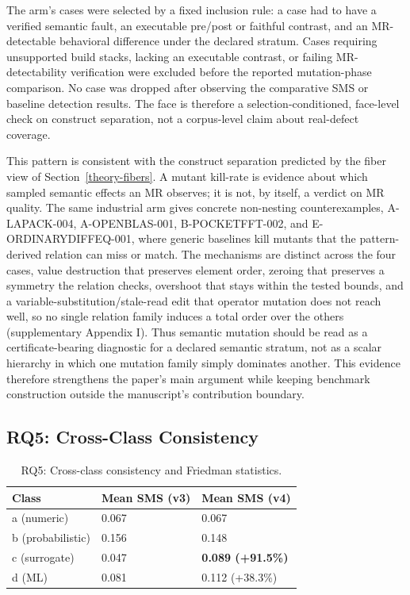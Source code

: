 \documentclass[manuscript,screen,review]{acmart}
\begin{document}
The arm's cases were selected by a fixed inclusion rule: a case had to have a
verified semantic fault, an executable pre/post or faithful contrast, and
an MR-detectable behavioral difference under the declared stratum.
Cases requiring unsupported build stacks, lacking an executable contrast,
or failing MR-detectability verification were excluded before the
reported mutation-phase comparison. No case was dropped after observing
the comparative SMS or baseline detection results. The face is therefore a selection-conditioned, face-level check on
construct separation, not a corpus-level claim about real-defect
coverage.

This pattern is consistent with the construct separation predicted by the
fiber view of Section~\ref{theory-fibers}. A mutant kill-rate is evidence about which sampled
semantic effects an MR observes; it is not, by itself, a verdict on MR
quality. The same industrial arm gives concrete non-nesting
counterexamples, A-LAPACK-004, A-OPENBLAS-001, B-POCKETFFT-002, and
E-ORDINARYDIFFEQ-001, where generic baselines kill mutants that the
pattern-derived relation can miss or match. The mechanisms are
distinct across the four cases, value destruction that preserves
element order, zeroing that preserves a symmetry the relation checks,
overshoot that stays within the tested bounds, and a
variable-substitution/stale-read edit that operator mutation does not
reach well, so no single relation family induces a total order over
the others (supplementary Appendix I).
Thus semantic mutation should be read as a certificate-bearing diagnostic
for a declared semantic stratum, not as a scalar hierarchy in which one
mutation family simply dominates another. This evidence therefore
strengthens the paper's main argument while keeping benchmark construction
outside the manuscript's contribution boundary.

\subsection{RQ5: Cross-Class Consistency}\label{rq3-cross-class-consistency-and-friedman}

{%
\begin{longtable}[]{@{}lll@{}}
\caption{RQ5: Cross-class consistency and Friedman statistics.}\label{tab:p2-12}\\
\toprule\noalign{}
Class & Mean SMS (v3) & Mean SMS (v4) \\
\midrule\noalign{}
\endfirsthead
\endhead
\bottomrule\noalign{}
\endlastfoot
a (numeric) & 0.067 & 0.067 \\
b (probabilistic) & 0.156 & 0.148 \\
c (surrogate) & 0.047 & \textbf{0.089 (+91.5\%)} \\
d (ML) & 0.081 & 0.112 (+38.3\%) \\
\end{longtable}
}
\end{document}

